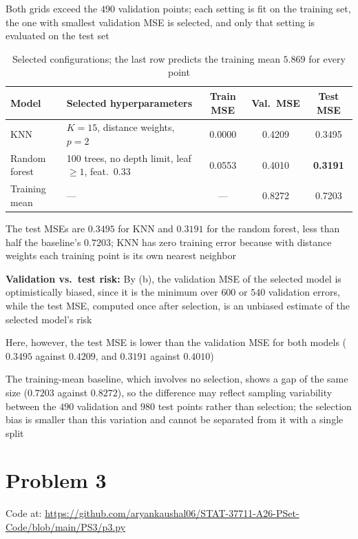 \documentclass{article}
\begin{document}
\begin{enumerate}[label=\alph*.]
Both grids exceed the $490$ validation points; each setting is fit on the training set, the one with smallest validation MSE is selected, and only that setting is evaluated on the test set

\begin{table}[H]
\centering
\begin{tabular}{llccc}
\toprule
Model & Selected hyperparameters & Train MSE & Val.\ MSE & Test MSE \\
\midrule
KNN & $K=15$, distance weights, $p=2$ & 0.0000 & 0.4209 & 0.3495 \\
Random forest & 100 trees, no depth limit, leaf $\geq1$, feat.\ $0.33$ & 0.0553 & 0.4010 & \textbf{0.3191} \\
Training mean & --- & --- & 0.8272 & 0.7203 \\
\bottomrule
\end{tabular}
\caption{Selected configurations; the last row predicts the training mean $5.869$ for every point}
\end{table}

The test MSEs are $\boxed{0.3495}$ for KNN and $\boxed{0.3191}$ for the random forest, less than half the baseline's $0.7203$; KNN has zero training error because with distance weights each training point is its own nearest neighbor

\textbf{Validation vs.\ test risk:} By (b), the validation MSE of the selected model is optimistically biased, since it is the minimum over $600$ or $540$ validation errors, while the test MSE, computed once after selection, is an unbiased estimate of the selected model's risk

Here, however, the test MSE is lower than the validation MSE for both models ($0.3495$ against $0.4209$, and $0.3191$ against $0.4010$)

The training-mean baseline, which involves no selection, shows a gap of the same size ($0.7203$ against $0.8272$), so the difference may reflect sampling variability between the $490$ validation and $980$ test points rather than selection; the selection bias is smaller than this variation and cannot be separated from it with a single split
\end{enumerate}

\section*{Problem 3}

Code at: \url{https://github.com/aryankaushal06/STAT-37711-A26-PSet-Code/blob/main/PS3/p3.py}
\end{document}
